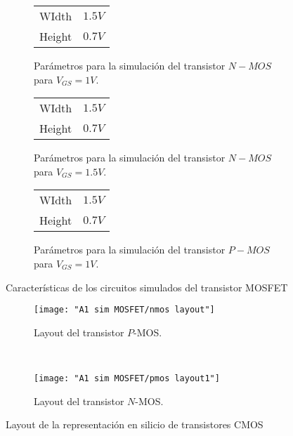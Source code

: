 \documentclass[9pt,technote]{IEEEtran}
\begin{document}
	\begin{figure}[H]
		\centering
		\begin{subfigure}[b]{0.45\columnwidth}
			\centering
			\begin{tabular}{|c|c|}
				\hline
				WIdth & $1.5V$ \\ 
				Height & $0.7V$ \\ 
				\hline
			\end{tabular}
			\caption{Parámetros para la simulación del transistor $N-MOS$ para $V_{GS}=1V$.}
			\label{Tabla:poly_param:1}
		\end{subfigure}
		\vfill
		\begin{subfigure}[b]{0.45\columnwidth}
			\centering
			\begin{tabular}{|c|c|} 
				\hline
				WIdth & $1.5V$ \\ 
				Height & $0.7V$ \\ 
				\hline 
			\end{tabular}
			\caption{Parámetros para la simulación del transistor $N-MOS$ para $V_{GS}=1.5V$.}
			\label{Tabla:active_param:1}
		\end{subfigure}
		\vfill
		\begin{subfigure}[b]{0.45\columnwidth}
			\centering
			\begin{tabular}{|c|c|} 
				\hline
				WIdth & $1.5V$ \\ 
				Height & $0.7V$ \\ 
				\hline
			\end{tabular}
			\caption{Parámetros para la simulación del transistor $P-MOS$ para $V_{GS}=1V$.}
			\label{Tabla:select_param:1}
		\end{subfigure}%
		\caption{Características de los circuitos simulados del transistor MOSFET}
		\label{fig:sim_param}
	\end{figure}
	
	\begin{figure}[H]
		\begin{subfigure}[t]{0.45\columnwidth}
			\centering
			\texttt{[image: "A1 sim MOSFET/nmos layout"]}
			\caption{Layout del transistor $P$-MOS.}
			\label{fig:nmos-layout:1}
		\end{subfigure}
		~
		\hfill
		\begin{subfigure}[t]{0.45\columnwidth}
			\centering
			\texttt{[image: "A1 sim MOSFET/pmos layout1"]}
			\caption{Layout del transistor $N$-MOS.}
			\label{fig:pmos-layout1:2}
		\end{subfigure}
		\caption{Layout de la representación en silicio de transistores CMOS}
		\label{fig:layout_transistores CMOS_Si}
	\end{figure}
\end{document}
